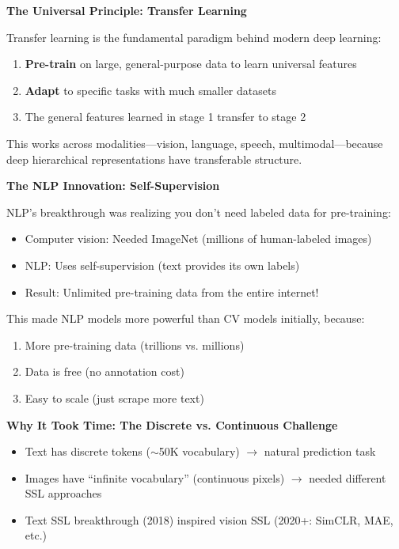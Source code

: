 \documentclass{article}
\begin{document}
\begin{tcolorbox}[colback=green!5!white, colframe=green!50!black, title=Core Principles: Transfer Learning and Self-Supervision]

\textbf{The Universal Principle: Transfer Learning}

Transfer learning is the fundamental paradigm behind modern deep learning:
\begin{enumerate}
\item \textbf{Pre-train} on large, general-purpose data to learn universal features
\item \textbf{Adapt} to specific tasks with much smaller datasets
\item The general features learned in stage 1 transfer to stage 2
\end{enumerate}

This works across modalities---vision, language, speech, multimodal---because deep hierarchical representations have transferable structure.

\vspace{0.3cm}

\textbf{The NLP Innovation: Self-Supervision}

NLP's breakthrough was realizing you don't need labeled data for pre-training:
\begin{itemize}
\item Computer vision: Needed ImageNet (millions of human-labeled images)
\item NLP: Uses self-supervision (text provides its own labels)
\item Result: Unlimited pre-training data from the entire internet!
\end{itemize}

This made NLP models more powerful than CV models initially, because:
\begin{enumerate}
\item More pre-training data (trillions vs. millions)
\item Data is free (no annotation cost)
\item Easy to scale (just scrape more text)
\end{enumerate}

\vspace{0.3cm}

\textbf{Why It Took Time: The Discrete vs. Continuous Challenge}

\begin{itemize}
\item Text has discrete tokens ($\sim$50K vocabulary) $\rightarrow$ natural prediction task
\item Images have ``infinite vocabulary'' (continuous pixels) $\rightarrow$ needed different SSL approaches
\item Text SSL breakthrough (2018) inspired vision SSL (2020+: SimCLR, MAE, etc.)
\end{itemize}
\end{tcolorbox}
\end{document}
